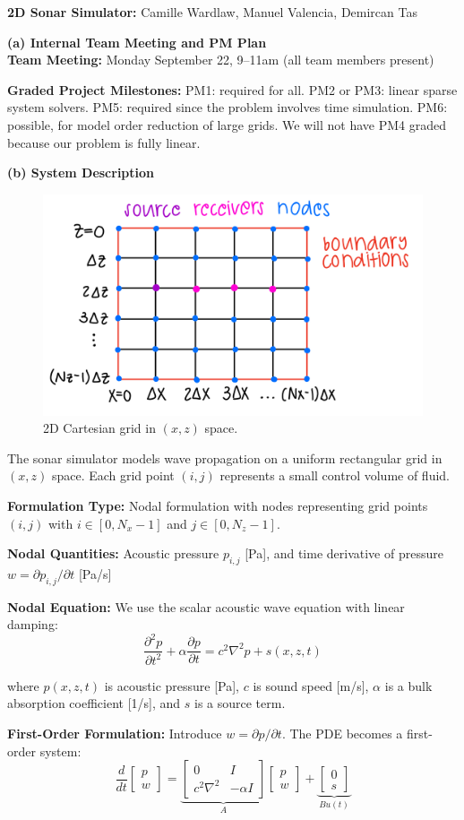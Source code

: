 \documentclass[11pt]{article}
\begin{document}
\textbf{2D Sonar Simulator: } Camille Wardlaw, Manuel Valencia, Demircan Tas 


\textbf{(a) Internal Team Meeting and PM Plan}\\
\textbf{Team Meeting:} Monday September 22, 9--11am (all team members present)

\textbf{Graded Project Milestones:}
PM1: required for all. PM2 or PM3: linear sparse system solvers. PM5: required since the problem involves time simulation. PM6: possible, for model order reduction of large grids. We will not have PM4 graded because our problem is fully linear.

\textbf{(b) System Description}

\begin{figure}[h]
    \centering
    \includegraphics[width=0.45\linewidth]{system.jpeg}
    \caption{2D Cartesian grid in $(x,z)$ space.}
\end{figure}

The sonar simulator models wave propagation on a uniform rectangular grid in $(x,z)$ space. Each grid point $(i,j)$ represents a small control volume of fluid.

\textbf{Formulation Type:} Nodal formulation with nodes representing grid points $(i,j)$ with $i \in [0,N_x-1]$ and $j \in [0,N_z-1]$.

\textbf{Nodal Quantities:} Acoustic pressure $p_{i,j}$ [Pa], and time derivative of pressure $w=\partial p_{i,j}/\partial t$ [Pa/s]


\textbf{Nodal Equation:} We use the scalar acoustic wave equation with linear damping:
\[
\frac{\partial^2 p}{\partial t^2} + \alpha \frac{\partial p}{\partial t} = c^2 \nabla^2 p + s(x,z,t)
\]

where $p(x,z,t)$ is acoustic pressure [Pa], $c$ is sound speed [m/s], $\alpha$ is a bulk absorption coefficient [1/s], and $s$ is a source term.

\textbf{First-Order Formulation:} Introduce $w=\partial p/\partial t$. The PDE becomes a first-order system:
\[
\frac{d}{dt}
\begin{bmatrix}p \\ w\end{bmatrix}
=
\underbrace{\begin{bmatrix}
0 & I \\ c^2 \nabla^2 & -\alpha I
\end{bmatrix}}_{A}
\begin{bmatrix}p \\ w\end{bmatrix}
+
\underbrace{\begin{bmatrix} 0 \\ s \end{bmatrix}}_{B u(t)}
\]
\end{document}
